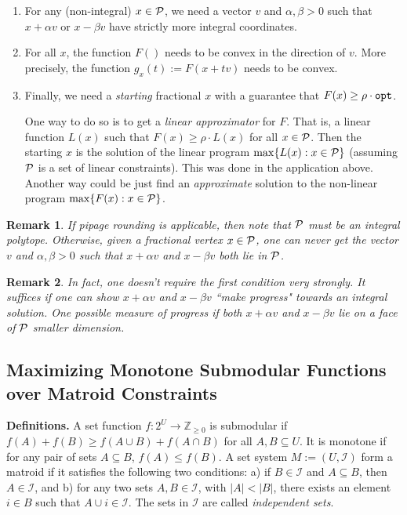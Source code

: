 \documentclass[11pt]{article}
\newtheorem{remark}{Remark}
\def\script#1{\mathcal{#1}}
\def\opt{{\tt opt}}
\begin{document}
\vspace{2ex}
\begin{center}
\begin{boxedminipage}{6.5in}
\begin{enumerate}
\item For any (non-integral) $x\in \P$, we need a vector $v$ and $\alpha,\beta > 0$ such that $x+\alpha v$
	or $x - \beta v$ have strictly more integral coordinates.
\item For all $x$, the function $F()$ needs to be convex in the direction of $v$. More precisely, the function 
	$g_x(t) := F(x+tv)$ needs to be convex.
\item Finally, we need a {\em starting} fractional $x$ with a guarantee that $F(x) \ge \rho\cdot \opt$.

	One way to do so is to get a {\em linear approximator} for $F$. That is, a linear function $L(x)$ such that 
	$F(x) \ge \rho\cdot L(x)$ for all $x\in \P$. Then the starting $x$ is the solution of the linear program 
	$\max\{L(x):x\in \P\}$ (assuming $\P$ is a set of linear constraints). This was done in the application 
	above. Another way could be just find an {\em approximate} solution to the non-linear program 
	$\max\{F(x): x\in \P\}$. 
\end{enumerate}
\end{boxedminipage}
\end{center}

\noindent

\begin{remark}
If pipage rounding is applicable, then note that $\P$ must be an integral polytope. Otherwise, given a fractional vertex $x\in \P$, one can never get the vector $v$ and $\alpha,\beta > 0$
such that $x + \alpha v$ and $x -\beta v$ both lie in $\P$. 
\end{remark}

\begin{remark}
In fact, one doesn't require the first condition very strongly. It suffices if one can show $x + \alpha v$
and $x - \beta v$ ``make progress" towards an integral solution. One possible measure of progress if
both $x+\alpha v$ and $x-\beta v$ lie on a face of $\P$ smaller dimension.
\end{remark}
\def\I{\script{I}}
\subsection*{Maximizing Monotone Submodular Functions over Matroid Constraints}
\noindent
{\bf Definitions.} A set function $f:2^U \to {\mathbb Z}_{\ge 0}$ is submodular if $f(A) + f(B) \ge f(A\cup B) + f(A\cap B)$ for all $A,B \subseteq U$. It is monotone if for any pair of sets $A\subseteq B$, $f(A) \le f(B)$.
A set system $M := (U,\script{I})$ form a matroid if it satisfies the following two conditions: a) if $B\in \script{I}$ and $A\subseteq B$, then $A\in \I$, and b) for any two sets $A,B \in \I$, with 
$|A| < |B|$, there exists an element $i\in B$ such that $A\cup i \in \I$.  The sets in $\I$ are called {\em independent sets}. \\
\end{document}
